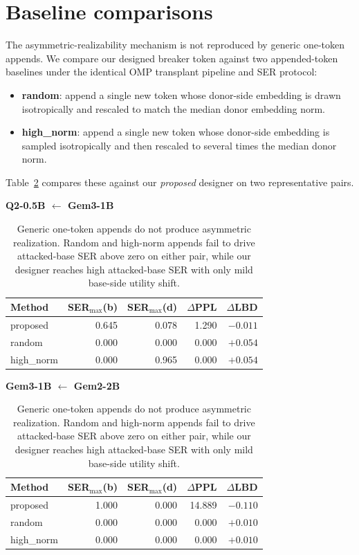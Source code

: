 \documentclass{article}
\theoremstyle{plain}
\theoremstyle{definition}
\theoremstyle{remark}
\begin{document}
\section{Baseline comparisons}
\label{app:baselines}

The asymmetric-realizability mechanism is not reproduced by generic one-token appends. We compare our designed breaker token against two appended-token baselines under the identical OMP transplant pipeline and SER protocol:
\begin{itemize}[leftmargin=*,nosep]
    \item \textbf{random}: append a single new token whose donor-side embedding is drawn isotropically and rescaled to match the median donor embedding norm.
    \item \textbf{high\_norm}: append a single new token whose donor-side embedding is sampled isotropically and then rescaled to several times the median donor norm.
\end{itemize}
Table~\ref{tab:baselines} compares these against our \emph{proposed} designer on two representative pairs.

\begin{table}[!htbp]
\centering
\small
\setlength{\tabcolsep}{3pt}
\caption{Generic one-token appends do not produce asymmetric realization. Random and high-norm appends fail to drive attacked-base SER above zero on either pair, while our designer reaches high attacked-base SER with only mild base-side utility shift.}
\label{tab:baselines}
\begin{minipage}[t]{0.49\linewidth}
  \centering
  \textbf{Q2-0.5B $\leftarrow$ Gem3-1B}\\[2pt]
  \begin{tabular}{lrrrr}
  \toprule
  Method & SER$_{\max}$(b) & SER$_{\max}$(d) & $\Delta$PPL & $\Delta$LBD \\
  \midrule
  proposed   & 0.645 & 0.078 & 1.290 & $-0.011$ \\
  random     & 0.000 & 0.000 & 0.000 & $+0.054$ \\
  high\_norm & 0.000 & 0.965 & 0.000 & $+0.054$ \\
  \bottomrule
  \end{tabular}
\end{minipage}\hfill
\begin{minipage}[t]{0.49\linewidth}
  \centering
  \textbf{Gem3-1B $\leftarrow$ Gem2-2B}\\[2pt]
  \begin{tabular}{lrrrr}
  \toprule
  Method & SER$_{\max}$(b) & SER$_{\max}$(d) & $\Delta$PPL & $\Delta$LBD \\
  \midrule
  proposed   & 1.000 & 0.000 & 14.889 & $-0.110$ \\
  random     & 0.000 & 0.000 & 0.000  & $+0.010$ \\
  high\_norm & 0.000 & 0.000 & 0.000  & $+0.010$ \\
  \bottomrule
  \end{tabular}
\end{minipage}
\end{table}
\end{document}
